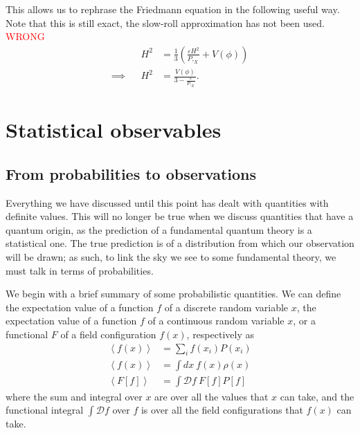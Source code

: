 This allows us to rephrase the Friedmann equation in the following useful
way. Note that this is still exact, the slow-roll approximation has
not been used.
\textcolor{red}{WRONG}
\begin{align}
    &&H^2 &= \frac{1}{3}\left(\frac{\varepsilon H^2}{P,_{X}}+V(\phi)\right)\\
    \implies &&  H^2 &= \frac{V(\phi)}{3-\frac{\varepsilon}{P,_{X}}}.
\end{align}


\section{Statistical observables}
\subsection{From probabilities to observations}\label{corr_functions}
    Everything we have discussed until this point has dealt with quantities
    with definite values. This will no longer
    be true when we discuss quantities that have a quantum origin, as
    the prediction of a fundamental quantum theory is a statistical one.
    The true prediction is of a distribution from which our observation will be drawn;
    as such, to link the sky we see to some fundamental theory,
    we must talk in terms of probabilities.


    We begin with a brief summary of some probabilistic quantities.
    We can define the expectation value of a function $f$ of a discrete random variable $x$,
    the expectation value of a function $f$ of a continuous random variable $x$,
    or a functional $F$ of a field configuration $f(x)$, respectively as
    \begin{align}
        \left<f(x)\right> &= \sum_i f(x_i) P(x_i)\label{expectation_value_discrete}\\
        \left<f(x)\right> &= \int dx~f(x) \rho(x)\label{expectation_value_cont}\\
        \left<F\left[f\right]\right> &= \int \mathcal{D}f~F\left[f\right] P\left[f\right]\label{expectation_value_field}
    \end{align}
    where the sum and integral over $x$ are over all the values that $x$ can take,
    and the functional integral $\int \mathcal{D}f$ over $f$ is over all the field configurations
    that $f(x)$ can take.


